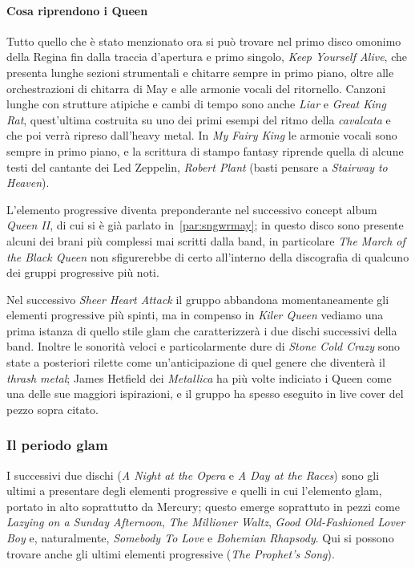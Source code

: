 \documentclass[12pt]{article}
\begin{document}
\paragraph{Cosa riprendono i Queen}
Tutto quello che è stato menzionato ora si può trovare nel primo disco omonimo della Regina fin dalla traccia d'apertura e primo singolo, \emph{Keep Yourself Alive}, che presenta lunghe sezioni strumentali e chitarre sempre in primo piano, oltre alle orchestrazioni di chitarra di May e alle armonie vocali del ritornello. Canzoni lunghe con strutture atipiche e cambi di tempo sono anche \emph{Liar} e \emph{Great King Rat}, quest'ultima costruita su uno dei primi esempi del ritmo della \emph{cavalcata} e che poi verrà ripreso dall'heavy metal. In \emph{My Fairy King} le armonie vocali sono sempre in primo piano, e la scrittura di stampo fantasy riprende quella di alcune testi del cantante dei Led Zeppelin, \emph{Robert Plant} (basti pensare a \emph{Stairway to Heaven}).

L'elemento progressive diventa preponderante nel successivo concept album \emph{Queen II}, di cui si è già parlato in~\ref{par:sngwrmay}; in questo disco sono presente alcuni dei brani più complessi mai scritti dalla band, in particolare \emph{The March of the Black Queen} non sfigurerebbe di certo all'interno della discografia di qualcuno dei gruppi progressive più noti.

Nel successivo \emph{Sheer Heart Attack} il gruppo abbandona momentaneamente gli elementi progressive più spinti, ma in compenso in \emph{Kiler Queen} vediamo una prima istanza di quello stile glam che caratterizzerà i due dischi successivi della band. Inoltre le sonorità veloci e particolarmente dure di \emph{Stone Cold Crazy} sono state a posteriori rilette come un'anticipazione di quel genere che diventerà il \emph{thrash metal}; James Hetfield dei \emph{Metallica} ha più volte indiciato i Queen come una delle sue maggiori ispirazioni, e il gruppo ha spesso eseguito in live cover del pezzo sopra citato.

\subsubsection{Il periodo glam}
I successivi due dischi (\emph{A Night at the Opera} e \emph{A Day at the Races}) sono gli ultimi a presentare degli elementi progressive e quelli in cui l'elemento glam, portato in alto soprattutto da Mercury; questo emerge soprattuto in pezzi come \emph{Lazying on a Sunday Afternoon}, \emph{The Millioner Waltz}, \emph{Good Old-Fashioned Lover Boy} e, naturalmente, \emph{Somebody To Love} e \emph{Bohemian Rhapsody}. Qui si possono trovare anche gli ultimi elementi progressive (\emph{The Prophet's Song}).
\end{document}
